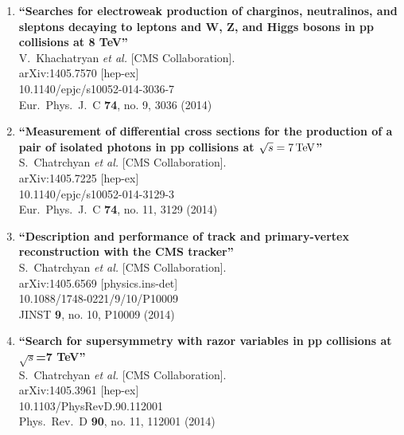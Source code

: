 \documentclass{article}
\begin{document}
\begin{enumerate}
\item%
{\bf ``Searches for electroweak production of charginos, neutralinos, and sleptons decaying to leptons and W, Z, and Higgs bosons in pp collisions at 8 TeV''}
  \\{}V.~Khachatryan {\it et al.}  [CMS Collaboration].
  \\{}arXiv:1405.7570 [hep-ex]
    \\{}10.1140/epjc/s10052-014-3036-7
\\{}Eur.\ Phys.\ J.\ C {\bf 74}, no. 9, 3036 (2014) %


\item%
{\bf ``Measurement of differential cross sections for the production of a pair of isolated photons in pp collisions at $\sqrt{s}=7\,\rm  {TeV} $''}
  \\{}S.~Chatrchyan {\it et al.}  [CMS Collaboration].
  \\{}arXiv:1405.7225 [hep-ex]
    \\{}10.1140/epjc/s10052-014-3129-3
\\{}Eur.\ Phys.\ J.\ C {\bf 74}, no. 11, 3129 (2014) %


\item%
{\bf ``Description and performance of track and primary-vertex reconstruction with the CMS tracker''}
  \\{}S.~Chatrchyan {\it et al.}  [CMS Collaboration].
  \\{}arXiv:1405.6569 [physics.ins-det]
    \\{}10.1088/1748-0221/9/10/P10009
\\{}JINST {\bf 9}, no. 10, P10009 (2014) %


\item%
{\bf ``Search for supersymmetry with razor variables in pp collisions at $\sqrt{s}$=7  TeV''}
  \\{}S.~Chatrchyan {\it et al.}  [CMS Collaboration].
  \\{}arXiv:1405.3961 [hep-ex]
    \\{}10.1103/PhysRevD.90.112001
\\{}Phys.\ Rev.\ D {\bf 90}, no. 11, 112001 (2014) %



\end{enumerate}
\end{document}
